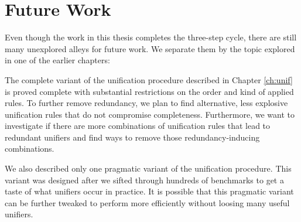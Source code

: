 


\section*{Future Work}

Even though the work in this thesis completes the three-step cycle, there are
still many unexplored alleys for future work. We separate them by the topic
explored in one of the earlier chapters:

 The complete variant of the unification procedure
described in Chapter \ref{ch:unif} is proved complete with substantial
restrictions on the order and kind of applied rules. To further
remove redundancy, we plan to find alternative, less explosive unification rules
that do not compromise completeness. Furthermore, we want to investigate if
there are more combinations of unification rules that lead to redundant unifiers
and find ways to remove those redundancy-inducing combinations.

We also described only one pragmatic variant of the unification procedure. This
variant was designed after we sifted through hundreds of benchmarks to get a
taste of what unifiers occur in practice. It is possible that this pragmatic variant
can be further tweaked to perform more efficiently without loosing many useful unifiers.

